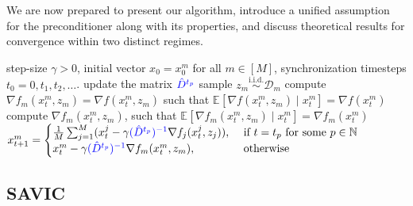 \documentclass[sn-mathphys,Numbered]{sn-jnl}%
\renewcommand{\|}{\parallel}
\newcommand\ec[2][]{\ensuremath{\mathbb{E}_{#1} \left[#2\right]}}
\newcommand{\N}{\mathbb{N}}
\newcommand{\D}{\mathcal{D}}
\renewcommand {\*} {\ast}
\begin{document}
We are now prepared to present our algorithm, introduce a unified assumption for the preconditioner along with its properties, and discuss theoretical results for convergence within two distinct regimes.


\begin{algorithm}
   \caption{Stochastic Adaptive Vehicle with Infrequent Communications}
   \label{alg:local_sgd_with_preconditioner}
\begin{algorithmic}[1]
  \REQUIRE step-size $\gamma > 0$, initial vector $x_0 = x_0^m$ for all $m \in [M]$, synchronization timesteps $t_0 = 0, t_1, t_2, \ldots$.
            \STATE update the matrix $\textcolor{blue}{\hat{D}^{t_p}}$
        \ENDIF
         \STATE sample $z_m \overset{\text{i.i.d.}}{\sim} \D_m$
            \STATE compute $\nabla f_m(x_t^m, z_m) = \nabla f(x_t^m, z_m)$ such that $\ec{\nabla f(x_t^m, z_m) \mid x_t^m} = \nabla f(x_t^m)$
         \ELSE
            \STATE compute $\nabla f_m(x_t^m, z_m)$, such that $\ec{\nabla f_m(x_t^m, z_m)\mid x_t^m}=\nabla f_m (x_t^m)$
         \ENDIF
         \STATE $x_{t+1}^m=
         \begin{cases}
         \frac{1}{M}\sum_{j=1}^M (x_t^j - \gamma \textcolor{blue}{(\hat{D}^{t_p})^{-1}}\nabla f_j(x_t^j, z_j)), & \text{ if } t = t_p \text { for some } p \in \N \\
         x_t^m - \gamma \textcolor{blue}{(\hat{D}^{t_p})^{-1}}\nabla f_m(x_t^m, z_m), & \text{ otherwise}
         \end{cases}$
      \ENDFOR
   \ENDFOR   
\end{algorithmic}
\end{algorithm}
\subsection{SAVIC}

 
   
\end{document}
